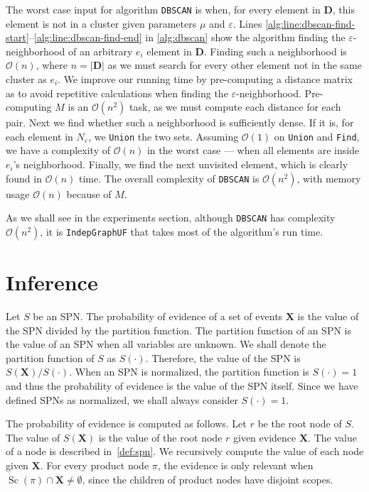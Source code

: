 \documentclass{amsart}
\DeclareMathOperator*{\Sc}{\text{Sc}}
\theoremstyle{plain}
\numberwithin{equation}{section}
\newcommand{\set}[1]{\mathbf{#1}}
\newcommand{\eps}{\varepsilon}
\newcommand{\bigo}{\mathcal{O}}
\newcommand{\code}[1]{\lstinline[mathescape=true]{#1}}
\begin{document}
The worst case input for algorithm \code{DBSCAN} is when, for every element in $\set{D}$, this
element is not in a cluster given parameters $\mu$ and $\eps$. Lines
\ref{alg:line:dbscan-find-start}--\ref{alg:line:dbscan-find-end} in \autoref{alg:dbscan} show the
algorithm finding the $\eps$-neighborhood of an arbitrary $e_i$ element in $\set{D}$. Finding such
a neighborhood is $\bigo(n)$, where $n=|\set{D}|$ as we must search for every other element not in
the same cluster as $e_i$. We improve our running time by pre-computing a distance matrix as to
avoid repetitive calculations when finding the $\eps$-neighborhood. Pre-computing $M$ is an
$\bigo(n^2)$ task, as we must compute each distance for each pair. Next we find whether such a
neighborhood is sufficiently dense. If it is, for each element in $N_\eps$, we \code{Union} the two
sets. Assuming $\bigo(1)$ on \code{Union} and \code{Find}, we have a complexity of $\bigo(n)$ in
the worst case --- when all elements are inside $e_i$'s neighborhood. Finally, we find the next
unvisited element, which is clearly found in $\bigo(n)$ time. The overall complexity of
\code{DBSCAN} is $\bigo(n^2)$, with memory usage $\bigo(n)$ because of $M$.

As we shall see in the experiments section, although \code{DBSCAN} has complexity $\bigo(n^2)$, it
is \code{IndepGraphUF} that takes most of the algorithm's run time.

\section{Inference}

Let $S$ be an SPN\@. The probability of evidence of a set of events $\set{X}$ is the value of the
SPN divided by the partition function. The partition function of an SPN is the value of an SPN when
all variables are unknown. We shall denote the partition function of $S$ as $S(\cdot)$. Therefore,
the value of the SPN is $S(\set{X})/S(\cdot)$. When an SPN is normalized, the partition function is
$S(\cdot)=1$ and thus the probability of evidence is the value of the SPN itself. Since we have
defined SPNs as normalized, we shall always consider $S(\cdot)=1$.

The probability of evidence is computed as follows. Let $r$ be the root node of $S$. The value of
$S(\set{X})$ is the value of the root node $r$ given evidence $\set{X}$. The value of a node is
described in~\autoref{def:spn}. We recursively compute the value of each node given $\set{X}$. For
every product node $\pi$, the evidence is only relevant when $\Sc(\pi)\cap\set{X}\neq\emptyset$,
since the children of product nodes have disjoint scopes.
\end{document}
